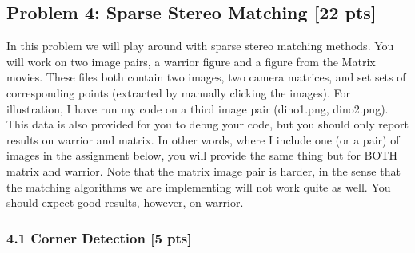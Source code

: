 \documentclass[11pt]{article}
\begin{document}
    \hypertarget{problem-4-sparse-stereo-matching-22-pts}{%
\subsection{Problem 4: Sparse Stereo Matching {[}22
pts{]}}\label{problem-4-sparse-stereo-matching-22-pts}}

    In this problem we will play around with sparse stereo matching methods.
You will work on two image pairs, a warrior figure and a figure from the
Matrix movies. These files both contain two images, two camera matrices,
and set sets of corresponding points (extracted by manually clicking the
images). For illustration, I have run my code on a third image pair
(dino1.png, dino2.png). This data is also provided for you to debug your
code, but you should only report results on warrior and matrix. In other
words, where I include one (or a pair) of images in the assignment
below, you will provide the same thing but for BOTH matrix and warrior.
Note that the matrix image pair is harder, in the sense that the
matching algorithms we are implementing will not work quite as well. You
should expect good results, however, on warrior.

    \hypertarget{corner-detection-5-pts}{%
\subsubsection{4.1 Corner Detection {[}5
pts{]}}\label{corner-detection-5-pts}}
\end{document}

